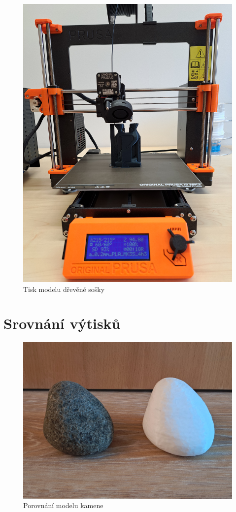 \documentclass[12pt]{report}			%
\begin{document}
\begin{appendices}
        \begin{figure}[h]
            \centering
            \includegraphics[height=\textwidth, angle = 270]{images/tisknutiSochy.jpg}
            \caption{Tisk modelu dřevěné sošky}
        \end{figure}
       
    \chapter{Srovnání výtisků}
        \begin{figure}[h]
            \centering
            \includegraphics[width =\textwidth]{images/kamenSrovnani.jpg}
            \caption{Porovnání modelu kamene}
        \end{figure}
       

\end{appendices}
\end{document}
